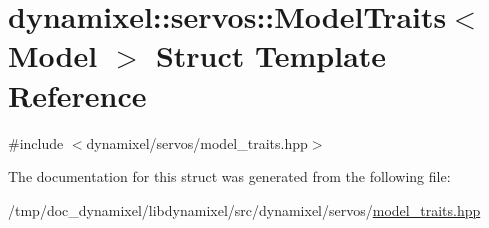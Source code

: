 \hypertarget{structdynamixel_1_1servos_1_1_model_traits}{}\section{dynamixel\+:\+:servos\+:\+:Model\+Traits$<$ Model $>$ Struct Template Reference}
\label{structdynamixel_1_1servos_1_1_model_traits}


{\ttfamily \#include $<$dynamixel/servos/model\+\_\+traits.\+hpp$>$}



The documentation for this struct was generated from the following file\+:\begin{DoxyCompactItemize}
\item 
/tmp/doc\+\_\+dynamixel/libdynamixel/src/dynamixel/servos/\hyperlink{model__traits_8hpp}{model\+\_\+traits.\+hpp}\end{DoxyCompactItemize}
